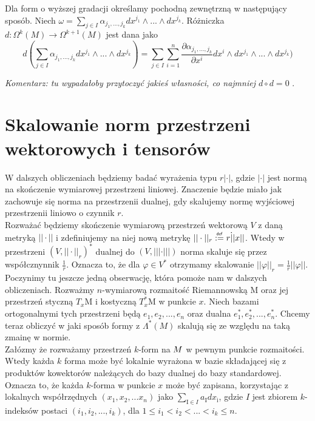 \documentclass[licencjacka]{pracamgr}
\theoremstyle{definition}
\theoremstyle{definition}
\theoremstyle{plain}
\theoremstyle{plain}
\theoremstyle{plain}
\theoremstyle{plain}
\def\M{\ensuremath M}
\newcommand\deff{\mathrel{\overset{\makebox[0pt]{\mbox{\normalfont\tiny\sffamily def}}}{:=}}}
\begin{document}
Dla form o wyższej gradacji określamy pochodną zewnętrzną w następujący
sposób. Niech 
$\omega = \sum_{j \in I} \alpha_{j_1, ..., j_k} dx^{j_1} \wedge ... \wedge dx^{j_k}$.
Różniczka $d: \Omega^k(M) \rightarrow \Omega^{k+1}(M)$ jest dana jako
\[ %
d( \sum_{j \in I} \alpha_{j_1, ..., j_k} dx^{j_1} \wedge ... \wedge dx^{j_k}) = 
 \sum_{j \in I} \sum_{i=1}^n
 \frac{ \partial \alpha_{j_1, ..., j_k}} {\partial x^i} dx^i
                            \wedge dx^{j_1} \wedge ... \wedge dx^{j_k})
\]

\emph{Komentarz: tu wypadałoby przytoczyć jakieś własności, co najmniej $d \circ d = 0$ }. \\


\section{Skalowanie norm przestrzeni wektorowych i tensorów}
W dalszych obliczeniach będziemy badać wyrażenia typu $r |\cdot|$, gdzie
$|\cdot|$ jest normą na skończenie wymiarowej przestrzeni liniowej.
Znaczenie będzie miało jak zachowuje się norma na przestrzenii dualnej,
gdy skalujemy normę wyjściowej przestrzenii liniowo o czynnik $r$. \\


Rozważać będziemy skończenie wymiarową przestrzeń wektorową $V$ z daną
metryką $|| \cdot ||$ i zdefiniujemy na niej nową metrykę $|| \cdot
||_r \deff r \dot || x ||$. Wtedy w przestrzeni $(V, ||
\cdot||_r)^\ast$ dualnej do $(V, ||| \cdot |||)$ norma skaluje się
przez współcznynnik $\frac{1}{r}$. Oznacza to, że dla $\varphi \in
V^\ast$ otrzymamy skalowanie $||\varphi||_r = \frac{1}{r} ||\varphi||$. \\

Poczynimy tu jeszcze jedną obserwację, która pomoże nam w dalszych
obliczeniach.  Rozważmy $n$-wymiarową rozmaitość Riemannowską
$\mathrm{M}$ oraz jej przestrzeń styczną $T_x\mathrm{M}$ i kostyczną
$T_x^\ast\mathrm{M}$ w punkcie $x$.  Niech bazami ortogonalnymi tych
przestrzeni będą $e_1, e_2, ..., e_n$ oraz dualna $e_1^\ast, e_2^\ast,
..., e_n^\ast$.  Chcemy teraz obliczyć w jaki sposób formy z
$\Lambda^\ast(M)$ skalują się ze względu na taką zmainę w
normie. \\

Załózmy że rozważamy przestrzeń $k$-form na $\M$ w pewnym
punkcie rozmaitości. Wtedy każda $k$ forma może być lokalnie wyrażona
w bazie składającej się z produktów kowektorów należących do bazy
dualnej do bazy standardowej. Oznacza to, że każda $k$-forma w punkcie
$x$ może być zapisana, korzystając z lokalnych współrzędnych $(x_1,
x_2, ... x_n)$ jako $ \sum_{\mathrm{I} \in I } a_\mathrm{I}
dx_\mathrm{i}$, gdzie $I$ jest zbiorem $k$-indeksów postaci
$(i_1, i_2, ..., i_k)$, dla $ 1 \leq i_1 < i_2 < ... < i_k \leq n$.  \\
\end{document}

